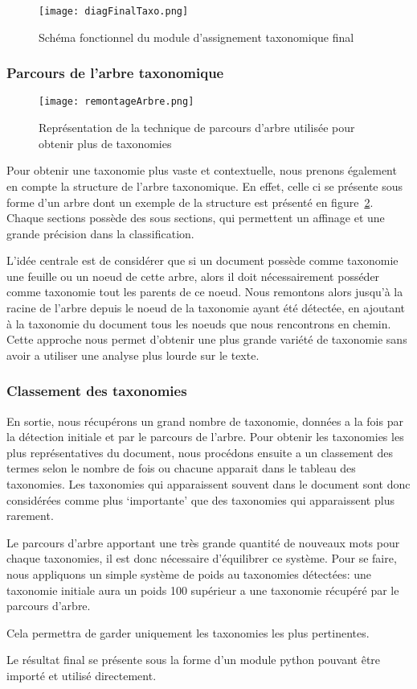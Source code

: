 \begin{figure}[h!]
  \centering
  \texttt{[image: diagFinalTaxo.png]}
	\caption[]{Schéma fonctionnel du module d'assignement taxonomique final}
	\label{taxoFinal}
\end{figure}

\subsubsection{Parcours de l'arbre taxonomique}
\begin{figure}[h!]
  \centering
  \texttt{[image: remontageArbre.png]}
	\caption[]{Représentation de la technique de parcours d'arbre utilisée pour obtenir plus de taxonomies}
	\label{fig:tree}
\end{figure}


Pour obtenir une taxonomie plus vaste et contextuelle, nous prenons également en compte la structure de l'arbre taxonomique.
En effet, celle ci se présente sous forme d'un arbre dont un exemple de la structure est présenté en figure~\ref{fig:tree}. 
Chaque sections possède des sous sections, qui permettent un affinage et une grande précision dans la classification.

L'idée centrale est de considérer que si un document possède comme taxonomie une feuille ou un noeud de cette arbre, alors il doit nécessairement posséder comme taxonomie tout les parents de ce noeud. 
Nous remontons alors jusqu'à la racine de l'arbre depuis le noeud de la taxonomie ayant été détectée, en ajoutant à la taxonomie du document tous les noeuds que nous rencontrons en chemin.
Cette approche nous permet d'obtenir une plus grande variété de taxonomie sans avoir a utiliser une analyse plus lourde sur le texte. 


\subsubsection{Classement des taxonomies}
En sortie, nous récupérons un grand nombre de taxonomie, données a la fois par la détection initiale et par le parcours de l'arbre.
Pour obtenir les taxonomies les plus représentatives du document, nous procédons ensuite a un classement des termes selon le nombre de fois ou chacune apparait dans le tableau des taxonomies.
Les taxonomies qui apparaissent souvent dans le document sont donc considérées comme plus `importante' que des taxonomies qui apparaissent plus rarement.

Le parcours d'arbre apportant une très grande quantité de nouveaux mots pour chaque taxonomies, il est donc nécessaire d'équilibrer ce système.
Pour se faire, nous appliquons un simple système de poids au taxonomies détectées: une taxonomie initiale aura un poids 100 supérieur a une taxonomie récupéré par le parcours d'arbre.

Cela permettra de garder uniquement les taxonomies les plus pertinentes.




Le résultat final se présente sous la forme d'un module python pouvant être importé et utilisé directement.

